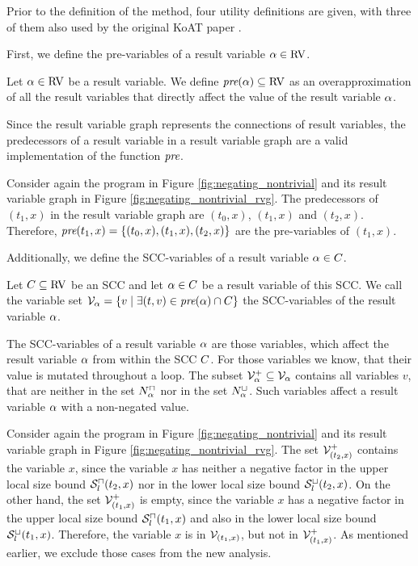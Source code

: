Prior to the definition of the method, four utility definitions are given, with three of them also used by the original KoAT paper \cite{koat}.

First, we define the pre-variables of a result variable $\alpha \in \text{RV}$.
\begin{definition}
  Let $\alpha \in \text{RV}$ be a result variable.
  We define $\emph{pre}(\alpha) \subseteq \text{RV}$ as an overapproximation of all the result variables that directly affect the value of the result variable $\alpha$.
\end{definition}
Since the result variable graph represents the connections of result variables, the predecessors of a result variable in a result variable graph are a valid implementation of the function $\emph{pre}$.
\begin{example}
  Consider again the program in Figure \ref{fig:negating_nontrivial} and its result variable graph in Figure \ref{fig:negating_nontrivial_rvg}.
  The predecessors of $(t_1,x)$ in the result variable graph are $(t_0,x)$, $(t_1,x)$ and $(t_2,x)$.
  Therefore, $\emph{pre}(t_1,x) = \lbrace (t_0,x), (t_1,x), (t_2,x) \rbrace$ are the pre-variables of $(t_1,x)$.
\end{example}

Additionally, we define the SCC-variables of a result variable $\alpha \in C$.
\begin{definition}
  Let $C \subseteq \text{RV}$ be an SCC and let $\alpha \in C$ be a result variable of this SCC.
  We call the variable set $\mathcal{V}_\alpha = \lbrace  v \mid \exists (t, v) \in \emph{pre}(\alpha) \cap C  \rbrace$ the SCC-variables of the result variable $\alpha$.
\end{definition}
The SCC-variables of a result variable $\alpha$ are those variables, which affect the result variable $\alpha$ from within the SCC $C$.
For those variables we know, that their value is mutated throughout a loop.
The subset $\mathcal{V}^+_\alpha \subseteq \mathcal{V}_\alpha$ contains all variables $v$, that are neither in the set $N^\sqcap_\alpha$ nor in the set $N^\sqcup_\alpha$.
Such variables affect a result variable $\alpha$ with a non-negated value.
\begin{example}
  Consider again the program in Figure \ref{fig:negating_nontrivial} and its result variable graph in Figure \ref{fig:negating_nontrivial_rvg}.
  The set $\mathcal{V}^+_{(t_2,x)}$ contains the variable $x$, since the variable $x$ has neither a negative factor in the upper local size bound ${\mathcal{S}^\sqcap_l}(t_2,x)$ nor in the lower local size bound ${\mathcal{S}^\sqcup_l}(t_2,x)$.
  On the other hand, the set $\mathcal{V}^+_{(t_1,x)}$ is empty, since the variable $x$ has a negative factor in the upper local size bound ${\mathcal{S}^\sqcap_l}(t_1,x)$ and also in the lower local size bound ${\mathcal{S}^\sqcup_l}(t_1,x)$.
  Therefore, the variable $x$ is in $\mathcal{V}_{(t_1,x)}$, but not in $\mathcal{V}^+_{(t_1,x)}$.
  As mentioned earlier, we exclude those cases from the new analysis.
\end{example}

